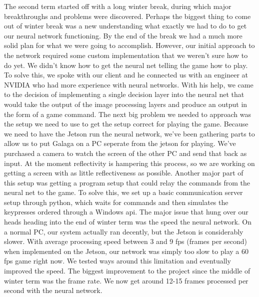 \documentclass[onecolumn, draftclsnofoot,10pt, compsoc]{IEEEtran}
\begin{document}
\newline\newline
The second term started off with a long winter break, during which major breakthroughs and problems were discovered.
Perhaps the biggest thing to come out of winter break was a new understanding what exactly we had to do to get our neural network functioning.
By the end of the break we had a much more solid plan for what we were going to accomplish.
However, our initial approach to the network required some custom implementation that we weren't sure how to do yet.
We didn't know how to get the neural net telling the game how to play.
To solve this, we spoke with our client and he connected us with an engineer at NVIDIA who had more experience with neural networks.
With his help, we came to the decision of implementing a single decision layer into the neural net that would take the output of the image processing layers and produce an output in the form of a game command.
\newline\newline
The next big problem we needed to approach was the setup we need to use to get the setup correct for playing the game.
Because we need to have the Jetson run the neural network, we've been gathering parts to allow us to put Galaga on a PC seperate from the jetson for playing.
We've purchased a camera to watch the screen of the other PC and send that back as input.
At the moment reflectivity is hampering this process, so we are working on getting a screen with as little reflectiveness as possible.
Another major part of this setup was getting a program setup that could relay the commands from the neural net to the game.
To solve this, we set up a basic communication server setup through python, which waits for commands and then simulates the keypresses ordered through a Windows api.
\newline\newline
The major issue that hung over our heads heading into the end of winter term was the speed the neural network.
On a normal PC, our system actually ran decently, but the Jetson is considerably slower.
With average processing speed between 3 and 9 fps (frames per second) when implemented on the Jetson, our network was simply too slow to play a 60 fps game right now.
We tested ways around this limitation and eventually improved the speed.
\newline\newline
The biggest improvement to the project since the middle of winter term was the frame rate.
We now get around 12-15 frames processed per second with the neural network.
\end{document}
